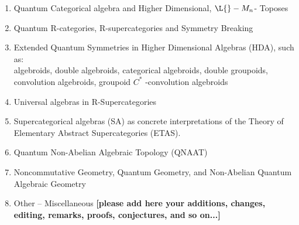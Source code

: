 \documentclass[12pt]{article}
\theoremstyle{plain}
\theoremstyle{definition}
\numberwithin{equation}{section}
\newcommand{\<}{{\langle}}
\begin{document}
\begin{enumerate}
\item Quantum Categorical algebra and Higher Dimensional, $\L{}-M_n$- Toposes

\item Quantum R-categories, R-supercategories and Symmetry Breaking

\item  Extended Quantum Symmetries in Higher Dimensional Algebras (HDA), such as:  \\
algebroids, double algebroids, categorical algebroids, double groupoids, \\
convolution algebroids, groupoid $C^*$ -convolution algebroids

\item Universal algebras in R-Supercategories

\item Supercategorical algebras (SA) as concrete interpretations of the Theory of Elementary Abstract Supercategories (ETAS). 

\item  Quantum Non-Abelian Algebraic Topology (QNAAT)

\item Noncommutative Geometry, Quantum Geometry, and Non-Abelian Quantum Algebraic Geometry

\item Other -- Miscellaneous \textbf{[please add here your additions, changes, editing, 
remarks, proofs, conjectures, and so on...]}

\end{enumerate}
\end{document}
